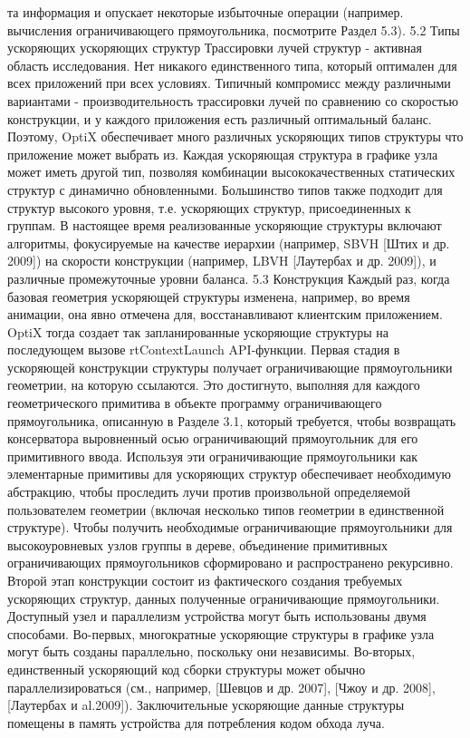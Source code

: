 та информация и опускает некоторые избыточные операции (например.
вычисления ограничивающего прямоугольника, посмотрите Раздел 5.3).
5.2 Типы ускоряющих ускоряющих структур Трассировки лучей структур - активная область исследования.
Нет никакого единственного типа, который оптимален для всех приложений при всех условиях. Типичный компромисс между различными вариантами - производительность трассировки лучей по сравнению со скоростью конструкции, и у каждого приложения есть различный оптимальный баланс. Поэтому, OptiX обеспечивает много различных ускоряющих типов структуры что приложение
может выбрать из. Каждая ускоряющая структура в графике узла может иметь другой тип, позволяя комбинации высококачественных статических структур с динамично обновленными. Большинство типов также подходит для структур высокого уровня, т.е. ускоряющих структур, присоединенных к группам.
В настоящее время реализованные ускоряющие структуры включают алгоритмы, фокусируемые на качестве иерархии (например, SBVH [Штих и др. 2009]) на скорости конструкции (например, LBVH [Лаутербах и др. 2009]), и различные промежуточные уровни баланса.
5.3 Конструкция
Каждый раз, когда базовая геометрия ускоряющей структуры изменена, например, во время анимации, она явно отмечена для, восстанавливают клиентским приложением. OptiX тогда создает так запланированные ускоряющие структуры на последующем вызове rtContextLaunch API-функции. Первая стадия в ускоряющей конструкции структуры получает ограничивающие прямоугольники геометрии, на которую ссылаются. Это достигнуто, выполняя для каждого геометрического примитива в объекте программу ограничивающего прямоугольника, описанную в Разделе 3.1, который требуется, чтобы возвращать консерватора выровненный осью ограничивающий прямоугольник для его примитивного ввода.
Используя эти ограничивающие прямоугольники как элементарные примитивы для ускоряющих структур обеспечивает необходимую абстракцию, чтобы проследить лучи против произвольной определяемой пользователем геометрии (включая несколько типов геометрии в единственной структуре). Чтобы получить необходимые ограничивающие прямоугольники для высокоуровневых узлов группы в дереве, объединение примитивных ограничивающих прямоугольников сформировано и распространено рекурсивно.
Второй этап конструкции состоит из фактического создания требуемых ускоряющих структур, данных полученные ограничивающие прямоугольники.
Доступный узел и параллелизм устройства могут быть использованы двумя способами. Во-первых, многократные ускоряющие структуры в графике узла могут быть созданы параллельно, поскольку они независимы. Во-вторых, единственный ускоряющий код сборки структуры может обычно параллелизироваться (см., например, [Шевцов и др. 2007], [Чжоу и др. 2008], [Лаутербах и al.2009]). Заключительные ускоряющие данные структуры помещены в память устройства для потребления кодом обхода луча.

